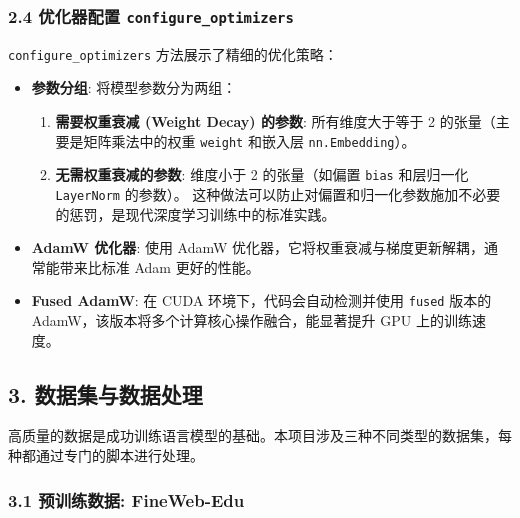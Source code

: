 \documentclass[a4paper]{article}
\providecommand{\tightlist}{%
  \setlength{\itemsep}{0pt}\setlength{\parskip}{0pt}}
\begin{document}
\subsubsection{\texorpdfstring{2.4 优化器配置
\texttt{configure\_optimizers}}{2.4 优化器配置 configure\_optimizers}}\label{ux4f18ux5316ux5668ux914dux7f6e-configure_optimizers}

\texttt{configure\_optimizers} 方法展示了精细的优化策略：

\begin{itemize}
\tightlist
\item
  \textbf{参数分组}: 将模型参数分为两组：

  \begin{enumerate}
  \def\labelenumi{\arabic{enumi}.}
  \tightlist
  \item
    \textbf{需要权重衰减 (Weight Decay) 的参数}: 所有维度大于等于 2
    的张量（主要是矩阵乘法中的权重 \texttt{weight} 和嵌入层
    \texttt{nn.Embedding}）。
  \item
    \textbf{无需权重衰减的参数}: 维度小于 2 的张量（如偏置 \texttt{bias}
    和层归一化 \texttt{LayerNorm} 的参数）。
    这种做法可以防止对偏置和归一化参数施加不必要的惩罚，是现代深度学习训练中的标准实践。
  \end{enumerate}
\item
  \textbf{AdamW 优化器}: 使用 AdamW
  优化器，它将权重衰减与梯度更新解耦，通常能带来比标准 Adam 更好的性能。
\item
  \textbf{Fused AdamW}: 在 CUDA 环境下，代码会自动检测并使用
  \texttt{fused} 版本的 AdamW，该版本将多个计算核心操作融合，能显著提升
  GPU 上的训练速度。
\end{itemize}

\subsection{3.
数据集与数据处理}\label{ux6570ux636eux96c6ux4e0eux6570ux636eux5904ux7406}

高质量的数据是成功训练语言模型的基础。本项目涉及三种不同类型的数据集，每种都通过专门的脚本进行处理。

\subsubsection{3.1 预训练数据:
FineWeb-Edu}\label{ux9884ux8badux7ec3ux6570ux636e-fineweb-edu}
\end{document}
